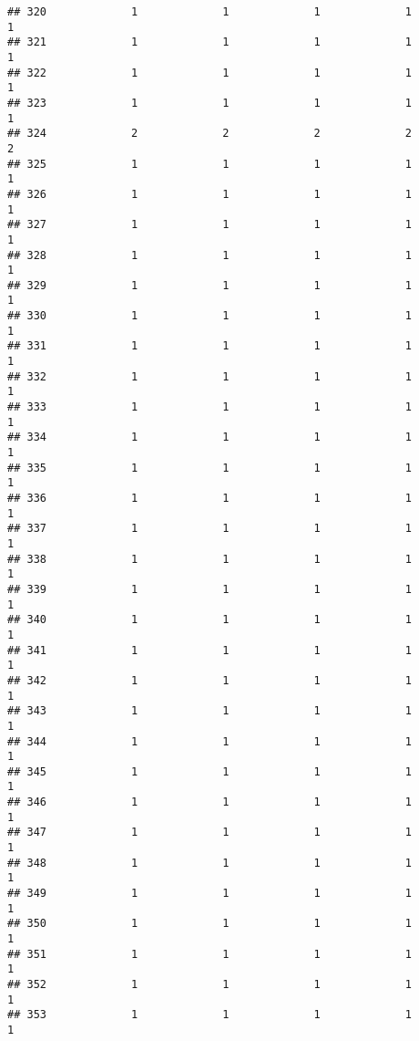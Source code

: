 \documentclass[
]{article}
\begin{document}
\begin{verbatim}
## 320             1             1             1             1             1
## 321             1             1             1             1             1
## 322             1             1             1             1             1
## 323             1             1             1             1             1
## 324             2             2             2             2             2
## 325             1             1             1             1             1
## 326             1             1             1             1             1
## 327             1             1             1             1             1
## 328             1             1             1             1             1
## 329             1             1             1             1             1
## 330             1             1             1             1             1
## 331             1             1             1             1             1
## 332             1             1             1             1             1
## 333             1             1             1             1             1
## 334             1             1             1             1             1
## 335             1             1             1             1             1
## 336             1             1             1             1             1
## 337             1             1             1             1             1
## 338             1             1             1             1             1
## 339             1             1             1             1             1
## 340             1             1             1             1             1
## 341             1             1             1             1             1
## 342             1             1             1             1             1
## 343             1             1             1             1             1
## 344             1             1             1             1             1
## 345             1             1             1             1             1
## 346             1             1             1             1             1
## 347             1             1             1             1             1
## 348             1             1             1             1             1
## 349             1             1             1             1             1
## 350             1             1             1             1             1
## 351             1             1             1             1             1
## 352             1             1             1             1             1
## 353             1             1             1             1             1

\end{verbatim}
\end{document}

